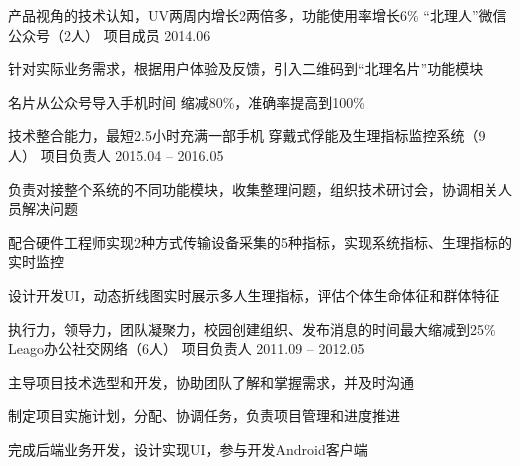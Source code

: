 \begin{cventries}
\cventry
{产品视角的技术认知，UV两周内增长2两倍多，功能使用率增长6\%} %
{“北理人”微信公众号（2人）} %
{项目成员} %
{2014.06} %
{ %
\begin{cvitems}
\item {针对实际业务需求，根据用户体验及反馈，引入二维码到“北理名片”功能模块}
\item{名片从公众号导入手机时间 缩减80\%，准确率提高到100\%}
\end{cvitems} 
}

\cventry
{技术整合能力，最短2.5小时充满一部手机} %
{穿戴式俘能及生理指标监控系统（9人）} %
{项目负责人} %
{2015.04 -- 2016.05} %
{ %
\begin{cvitems}
\item {负责对接整个系统的不同功能模块，收集整理问题，组织技术研讨会，协调相关人员解决问题}
\item {配合硬件工程师实现2种方式传输设备采集的5种指标，实现系统指标、生理指标的实时监控}
\item{设计开发UI，动态折线图实时展示多人生理指标，评估个体生命体征和群体特征}
\end{cvitems} 
}


\cventry
{执行力，领导力，团队凝聚力，校园创建组织、发布消息的时间最大缩减到25\%} %
{Leago办公社交网络（6人）} %
{项目负责人} %
{2011.09 -- 2012.05} %
{ %
\begin{cvitems}
\item {主导项目技术选型和开发，协助团队了解和掌握需求，并及时沟通}
\item {制定项目实施计划，分配、协调任务，负责项目管理和进度推进}
\item{完成后端业务开发，设计实现UI，参与开发Android客户端}
\end{cvitems}
}

\end{cventries}


